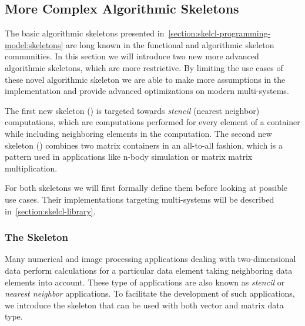 \subsection{More Complex Algorithmic Skeletons}
\label{section:skelcl-programming-model:specialSkeletons}

The basic algorithmic skeletons presented in~\autoref{section:skelcl-programming-model:skeletons} are long known in the functional and algorithmic skeleton communities.
In this section we will introduce two new more advanced algorithmic skeletons, which are more restrictive.
By limiting the use cases of these novel algorithmic skeleton we are able to make more assumptions in the implementation and provide advanced optimizations on modern multi-\GPU systems.

The first new skeleton (\stencil) is targeted towards \emph{stencil} (\aka nearest neighbor) computations, which are computations performed for every element of a container while including neighboring elements in the computation.
The second new skeleton (\allpairs) combines two matrix containers in an all-to-all fashion, which is a pattern used in applications like n-body simulation or matrix matrix multiplication.

For both skeletons we will first formally define them before looking at possible use cases.
Their implementations targeting multi-\GPU systems will be described in~\autoref{section:skelcl-library}.


\subsubsection{The \stencil Skeleton}

Many numerical and image processing applications dealing with two-dimensional data perform calculations for a particular data element taking neighboring data elements into account.
These type of applications are also known as \emph{stencil} or \emph{nearest neighbor} applications.
To facilitate the development of such applications, we introduce the \stencil skeleton that can be used with both vector and matrix data type.

